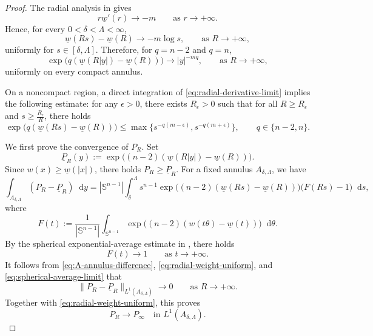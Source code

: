 \documentclass[12pt]{amsart}
\theoremstyle{plain}
\theoremstyle{definition}
\theoremstyle{remark}     %
\numberwithin{equation}{section}
\newcommand{\dd}{\mathop{}\!\mathrm{d}}%
\begin{document}
\begin{proof}
The radial analysis in \cite[Lemma 2.6]{M} gives
\begin{equation}\label{eq:radial-derivative-limit}
    r\underline w'(r)\to -m \qquad
    \text{as } r\to +\infty.
\end{equation}
Hence, for every $0<\delta<\Lambda<\infty$,
\[
    \underline w(Rs)-\underline w(R)
    \to -m\log s,\qquad
    \text{as }R\to +\infty,
\]
uniformly for $s\in[\delta,\Lambda]$.  Therefore, for $q=n-2$ and
$q=n$,
\begin{equation}\label{eq:radial-weight-uniform}
    \exp\bigl(q(\underline w(R|y|)-\underline w(R))\bigr)
    \to |y|^{-mq},\qquad
    \text{as }R\to +\infty,
\end{equation}
uniformly on every compact annulus.

On a noncompact region,  a direct  integration of \cref{eq:radial-derivative-limit}  implies the following estimate: for any $\epsilon>0$, there exists $R_\epsilon>0$ such that for all $R\geq R_\epsilon$ and $s\geq \frac{R_\epsilon}{R}$, there holds
\begin{equation}\label{eq:potter-bound}
     \exp\bigl(q(\underline w(Rs)-\underline w(R))\bigr)
    \leq \max\{ s^{-q(m-\epsilon)}, s^{-q(m+\epsilon)} \}, 
    \qquad q\in\{n-2,n\}.
\end{equation}

We first prove the convergence of $P_R$.  Set
\[
    \underline P_R(y)
    :=\exp\bigl((n-2)(\underline w(R|y|)-\underline w(R))\bigr).
\]
Since $w(x)\geq\underline w(|x|)$, there holds $P_R\geq \underline P_R.$
For a fixed annulus $A_{\delta,\Lambda}$, we have
\begin{equation}\label{eq:A-annulus-difference}
\int_{A_{\delta,\Lambda}}(P_R-\underline P_R)\dd y
=
|\mathbb S^{n-1}|
\int_\delta^\Lambda s^{n-1}
\exp\bigl((n-2)(\underline w(Rs)-\underline w(R))\bigr)
\bigl(F(Rs)-1\bigr)\dd s,
\end{equation}
where
\[
    F(t):=
    \frac{1}{|\mathbb S^{n-1}|}\int_{\mathbb S^{n-1}}
    \exp\bigl((n-2)(w(t\theta)-\underline w(t))\bigr)\dd \theta.
\]
By the spherical exponential-average estimate in
\cite[Lemma 4.7]{M}, there holds
\begin{equation}\label{eq:spherical-average-limit}
    F(t)\to 1\qquad 
    \text{as }t\to+\infty.
\end{equation}
 It follows from
\cref{eq:A-annulus-difference}, \cref{eq:radial-weight-uniform}, and
\cref{eq:spherical-average-limit} that
\[
    \|P_R-\underline P_R\|_{L^1(A_{\delta,\Lambda})}
    \to 0\qquad
    \text{as } R\to+\infty.
\]
Together with \cref{eq:radial-weight-uniform}, this proves
\begin{equation}\label{eq:A-L1-annulus}
    P_R\to P_\infty
    \quad\text{in }L^1(A_{\delta,\Lambda}).
\end{equation}


\end{proof}
\end{document}
